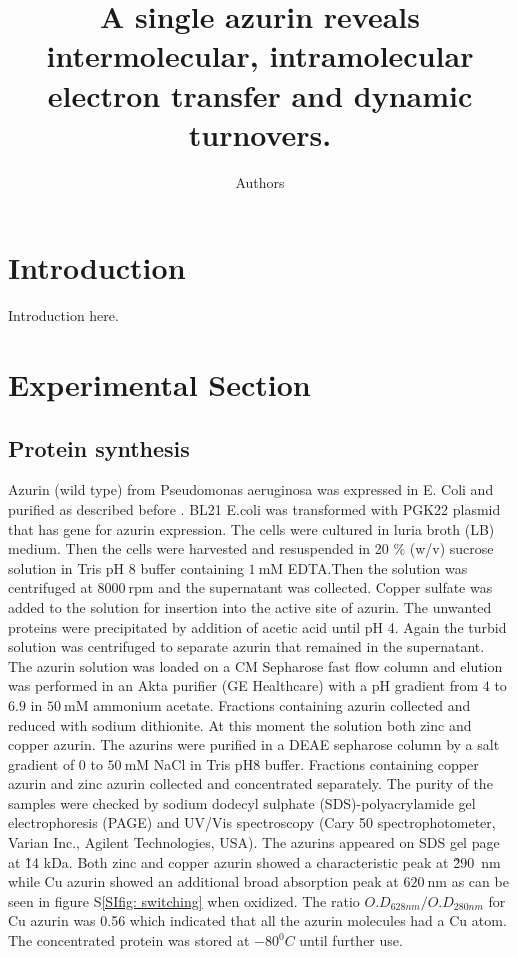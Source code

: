 \documentclass[journal=jacsat,manuscript=article]{achemso}
\author{Authors}
\affiliation{Huygens-Kamerlingh Onnes Laboratory, Leiden University, RA, Leiden, The Netherlands}
\title[]
{A single azurin reveals intermolecular, intramolecular electron transfer and dynamic turnovers.}
\begin{document}
\section{Introduction}
Introduction here.
\section{Experimental Section}
\subsection{Protein synthesis}
Azurin (wild type) from Pseudomonas aeruginosa was expressed in E. Coli and purified as described before \citep{kamp1990purification}. BL21 E.coli was transformed with PGK22 plasmid that has gene for azurin expression. The cells were cultured in luria broth (LB) medium. Then the cells were harvested and resuspended in 20 \% (w/v) sucrose solution in Tris pH 8 buffer containing $1~$mM EDTA.Then the solution was centrifuged at $8000~$rpm and the supernatant was collected. Copper sulfate was added to the solution for insertion into the active site of azurin. The unwanted proteins were precipitated by addition of acetic acid until pH 4. Again the turbid solution was centrifuged to separate azurin that remained in the supernatant. The azurin solution was loaded on a CM Sepharose fast flow column and elution was performed in an Akta purifier (GE Healthcare) with a pH gradient from $4$ to $6.9$ in $50~$mM ammonium acetate. Fractions containing azurin collected and reduced with sodium dithionite. At this moment the solution both zinc and copper azurin. The azurins were purified in a DEAE sepharose column by a salt gradient of 0 to $50~$mM NaCl in Tris pH8 buffer. Fractions containing copper azurin and zinc azurin collected and concentrated separately. The purity of the samples were checked by sodium dodecyl sulphate (SDS)-polyacrylamide gel electrophoresis (PAGE) and UV/Vis spectroscopy (Cary 50 spectrophotometer, Varian Inc., Agilent Technologies, USA). The azurins appeared on SDS gel page at \~14 kDa. Both zinc and copper azurin showed a characteristic peak at \~290~nm while Cu azurin showed an additional broad absorption peak at $620~$nm as can be seen in figure S\ref{SIfig: switching} when oxidized. The ratio $O.D_{628nm}/O.D_{280nm}$ for Cu azurin was 0.56 which indicated that all the azurin molecules had a Cu atom. The concentrated protein was stored at $-80^0 C$ until further use.
\end{document}

